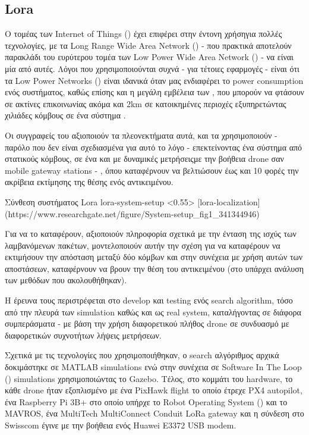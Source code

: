 \subsection{Lora}

Ο τομέας των Internet of Things () έχει επιφέρει στην έντονη χρήση\udot για πολλές τεχνολογίες, με τα Long Range Wide Area Network () - που πρακτικά αποτελούν παρακλάδι του ευρύτερου τομέα των Low Power Wide Area Network () - να είναι μία από αυτές. Λόγοι που χρησιμοποιούνται συχνά - για τέτοιες εφαρμογές - είναι ότι τα Low Power Networks () είναι ιδανικά όταν μας ε\-νδια\-φέ\-ρει το 
power consumption ενός συστήματος, καθώς επίσης και η μεγάλη εμβέλεια των , που μπορούν να φτάσουν σε ακτίνες επικοινωνίας ακόμα και 2km σε κατοικημένες περιοχές εξυπηρετώντας χιλιάδες κόμβους σε ένα σύστημα \cite{lora-localization}.

Οι συγγραφείς του \cite{lora-localization} αξιοποιούν τα πλεονεκτήματα αυτά,
και τα χρησιμοποιούν - παρόλο που δεν είναι σχεδιασμένα για αυτό το λόγο - επεκτείνοντας ένα σύστημα από στατικούς κόμβους, σε ένα και με δυναμικές μετρήσεις\udot με την βοήθεια drone σαν  mobile gateway stations - , όπου καταφέρνουν να βελτιώσουν έως και 10 φορές την ακρίβεια εκτίμησης της θέσης ενός αντικειμένου.

%
{Σύνθεση συστήματος Lora}%
{lora-system-setup}%
<0.55>%
[lora-localization](https://www.researchgate.net/figure/System-setup_fig1_341344946)

Για να το καταφέρουν, αξιοποιούν πληροφορία σχετικά με την ένταση της ισχύς των λαμβανόμενων πακέτων, μοντελοποιούν αυτήν την σχέση για να καταφέρουν να εκτιμήσουν την απόσταση μεταξύ δύο κόμβων και στην συνέχεια με χρήση αυτών των αποστάσεων, καταφέρνουν να 
βρουν την θέση του αντικειμένου (στο  υπάρχει ανάλυση των μεθόδων που ακολουθήθηκαν).

Η έρευνα τους περιστρέφεται στο develop και testing ενός search algorithm, τόσο από την πλευρά των simulation καθώς και ως real system, καταλήγοντας σε διάφορα συμπεράσματα - με βάση την χρήση διαφορετικού πλήθος drone σε συνδυασμό με διαφορετικών συχνοτήτων λήψεις μετρήσεων.

Σχετικά με τις τεχνολογίες που χρησιμοποιήθηκαν, ο search αλγόριθμος αρχικά δοκιμάστηκε σε 
MATLAB simulations ενώ στην συνέχεια σε Software In The Loop () simulations χρησιμοποιώντας 
το Gazebo. Τέλος, στο κομμάτι του hardware, το κάθε drone ήταν εξοπλισμένο με ένα PixHawk flight το οποίο έτρεχε PX4 autopilot, ένα Raspberry Pi 3B+ στο οποίο υπήρχε το Robot Operating System () και το MAVROS, ένα MultiTech MultiConnect Conduit LoRa gateway και η σύνδεση στο Swisscom  έγινε με την βοήθεια ενός Huawei E3372 USB modem.

